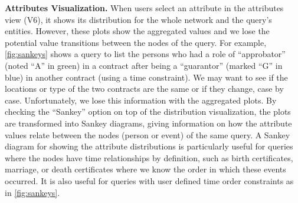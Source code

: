 \textbf{Attributes Visualization.} When users select an attribute in the attributes view (V6), it shows its distribution for the whole network and the query's entities.  However, these plots show the aggregated values and we lose the potential value transitions between the nodes of the query.
For example, \autoref{fig:sankeys} shows a query to list the persons who had a role of ``approbator'' (noted ``A'' in green) in a contract after being a ``guarantor'' (marked ``G'' in blue) in another contract (using a time constraint). We may want to see if the locations or type of the two contracts are the same or if they change, case by case. Unfortunately, we lose this information with the aggregated plots. By checking the ``Sankey'' option on top of the distribution visualization, the plots are transformed into Sankey diagrams, giving information on how the attribute values relate between the nodes (person or event) of the same query.
A Sankey diagram for showing the attribute distributions is particularly useful for queries where the nodes have time relationships by definition, such as birth certificates, marriage, or death certificates where we know the order in which these events occurred. It is also useful for queries with user defined time order constraints as in \autoref{fig:sankeys}.






